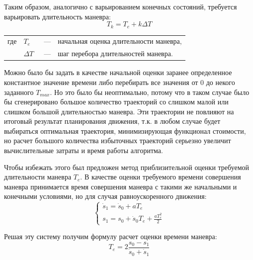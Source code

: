 Таким образом, аналогично с варьированием конечных состояний, требуется варьировать длительность маневра:
\begin{equation}
      T_k = T_e + k\Delta T
\end{equation}
\noindent\begin{tabularx}{\linewidth}{lllX}
      где & $T_e$      &~---& начальная оценка длительности маневра, \\
          & $\Delta T$ &~---& шаг перебора длительностей маневра.
\end{tabularx}

Можно было бы задать в качестве начальной оценки заранее определенное константное значение времени либо перебирать
все значения от 0 до некого заданного $T_{max}$. Но это было бы неоптимально, потому что в таком случае было бы
сгенерировано большое количество траекторий со слишком малой или слишком большой длительностью маневра. Эти траектории
не повлияют на итоговый результат планирования движения, т.к. в любом случае будет выбираться оптимальная траектория,
минимизирующая функционал стоимости, но расчет большого количества избыточных траекторий серьезно увеличит вычислительные
затраты и время работы алгоритма.

Чтобы избежать этого был предложен метод приблизительной оценки требуемой длительности маневра $T_e$. В качестве оценки
требуемого времени совершения маневра принимается время совершения маневра с такими же начальными и конечными
условиями, но для случая равноускоренного движения:
\begin{equation}
      \begin{cases}
            \dot{s}_1 = \dot{s}_0 + aT_e \\
            s_1       = s_0       + \dot{s}_0T_e + \frac{aT_e^2}{2}
      \end{cases}
\end{equation}

Решая эту систему получим формулу расчет оценки времени маневра:
\begin{equation}
      T_e = 2\frac{s_0 - s_1}{\dot{s}_0 + \dot{s}_1}
\end{equation}

